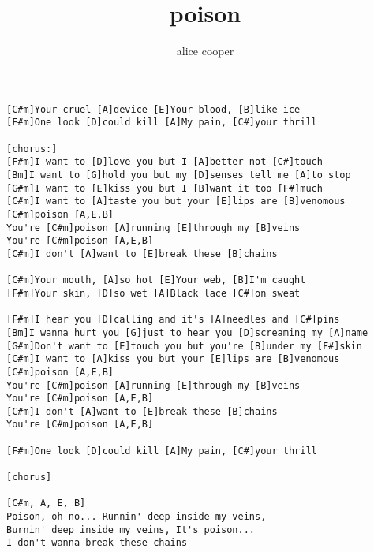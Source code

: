 \author{alice cooper}
\title{poison}
\maketitle

\begin{verbatim}   
[C#m]Your cruel [A]device [E]Your blood, [B]like ice
[F#m]One look [D]could kill [A]My pain, [C#]your thrill

[chorus:]
[F#m]I want to [D]love you but I [A]better not [C#]touch
[Bm]I want to [G]hold you but my [D]senses tell me [A]to stop
[G#m]I want to [E]kiss you but I [B]want it too [F#]much
[C#m]I want to [A]taste you but your [E]lips are [B]venomous
[C#m]poison [A,E,B]
You're [C#m]poison [A]running [E]through my [B]veins
You're [C#m]poison [A,E,B]
[C#m]I don't [A]want to [E]break these [B]chains

[C#m]Your mouth, [A]so hot [E]Your web, [B]I'm caught
[F#m]Your skin, [D]so wet [A]Black lace [C#]on sweat

[F#m]I hear you [D]calling and it's [A]needles and [C#]pins
[Bm]I wanna hurt you [G]just to hear you [D]screaming my [A]name
[G#m]Don't want to [E]touch you but you're [B]under my [F#]skin
[C#m]I want to [A]kiss you but your [E]lips are [B]venomous
[C#m]poison [A,E,B]
You're [C#m]poison [A]running [E]through my [B]veins
You're [C#m]poison [A,E,B]
[C#m]I don't [A]want to [E]break these [B]chains
You're [C#m]poison [A,E,B]

[F#m]One look [D]could kill [A]My pain, [C#]your thrill

[chorus]

[C#m, A, E, B]
Poison, oh no... Runnin' deep inside my veins,
Burnin' deep inside my veins, It's poison...
I don't wanna break these chains
\end{verbatim}
